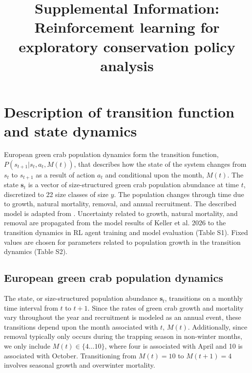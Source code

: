 \documentclass{article}
\title{Supplemental Information: Reinforcement learning for exploratory conservation policy analysis}
\begin{document}
\date{}

\maketitle

\tableofcontents
\newpage

\date{}

\section{Description of transition function and state dynamics}

European green crab population dynamics form the transition function, $P(s_{t+1}|s_t,a_t, M(t))$, that describes how the state of the system changes from $s_t$ to $s_{t+1}$ as a result of action $a_t$ and conditional upon the month, $M(t)$. The state $\textbf{s}_t$ is a vector of size-structured green crab population abundance at time $t$, discretized to 22 size classes of size $y$. The population changes through time due to growth, natural mortality, removal, and annual recruitment. The described model is adapted from \cite{keller2026integrated}. Uncertainty related to growth, natural mortality, and removal are propagated from the model results of Keller et al. 2026 to the transition dynamics in RL agent training and model evaluation (Table S1). Fixed values are chosen for parameters related to population growth in the transition dynamics (Table S2).



\subsection{European green crab population dynamics}

The state, or size-structured population abundance $\textbf{s}_t$, transitions on a monthly time interval from $t$ to $t+1$. Since the rates of green crab growth and mortality vary throughout the year and recruitment is modeled as an annual event, these transitions depend upon the month associated with $t$, $M(t)$. Additionally, since removal typically only occurs during the trapping season in non-winter months, we only include $M(t) \in \{4 \dots 10 \}$, where four is associated with April and 10 is associated with October. Transitioning from $M(t) = 10$ to  $M(t+1) = 4$ involves seasonal growth and overwinter mortality.
\end{document}
